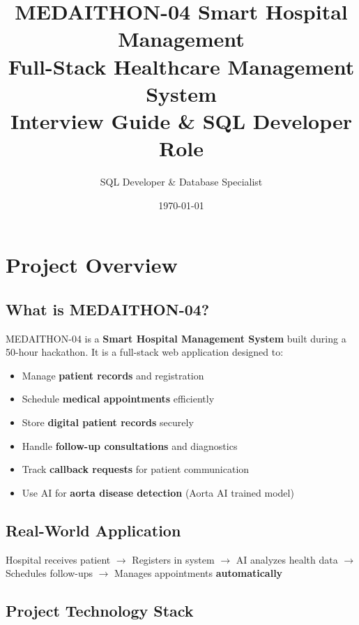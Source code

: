 \documentclass[12pt,a4paper]{article}
\title{\textbf{\Large MEDAITHON-04 Smart Hospital Management}\\
\textbf{Full-Stack Healthcare Management System}\\
\normalsize Interview Guide \& SQL Developer Role}
\author{SQL Developer \& Database Specialist}
\date{\today}
\begin{document}
\maketitle

\tableofcontents
\newpage

\section{Project Overview}

\subsection{What is MEDAITHON-04?}

MEDAITHON-04 is a \textbf{Smart Hospital Management System} built during a 50-hour hackathon. It is a full-stack web application designed to:

\begin{itemize}
    \item Manage \textbf{patient records} and registration
    \item Schedule \textbf{medical appointments} efficiently
    \item Store \textbf{digital patient records} securely
    \item Handle \textbf{follow-up consultations} and diagnostics
    \item Track \textbf{callback requests} for patient communication
    \item Use AI for \textbf{aorta disease detection} (Aorta AI trained model)
\end{itemize}

\subsection{Real-World Application}

\begin{tcolorbox}[colback=blue!10,colframe=blue!50!black,title=Healthcare Use Case]
Hospital receives patient $\rightarrow$ Registers in system $\rightarrow$ AI analyzes health data $\rightarrow$ Schedules follow-ups $\rightarrow$ Manages appointments \textbf{automatically}
\end{tcolorbox}

\subsection{Project Technology Stack}
\end{document}
